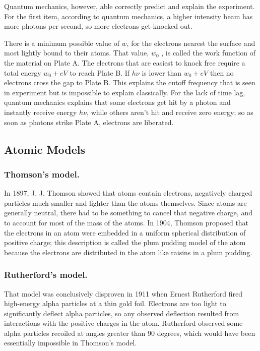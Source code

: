 \documentclass[../../main.tex]{subfiles}
\begin{document}
Quantum mechanics, however, able correctly predict and explain the experiment. For the first item, according to quantum mechanics, a higher intensity beam has more photons per second, so more electrons get knocked out. 

There is a minimum possible value of $w$, for the electrons nearest the surface and most lightly bound to their atoms. That value, $w_0$ , is called the work function of the material on Plate A. The electrons that are easiest to knock free require a total energy $w_0 + eV $ to reach Plate B. If $h\nu$ is lower than $w_0 + eV$ then no electrons cross the gap to Plate B. This explains the cutoff frequency that is seen in experiment but is impossible to explain classically. For the lack of time lag, quantum mechanics explains that some electrons get hit by a photon and instantly receive energy $h\nu$, while others aren't hit and receive zero energy; so as soon as photons strike Plate A, electrons are liberated.

\subsection{Atomic Models}
\subsubsection{Thomson's model.} In 1897, J. J. Thomson showed that atoms contain electrons, negatively charged particles much smaller and lighter than the atoms themselves. Since atoms are generally neutral, there had to be something to cancel that negative charge, and to account for most of the mass of the atoms. In 1904, Thomson proposed that the electrons in an atom were embedded in a uniform spherical distribution of positive charge; this description is called the plum pudding model of the atom because the electrons are distributed in the atom like raisins in a plum pudding.

\subsubsection{Rutherford's model.} That model was conclusively disproven in 1911 when Ernest Rutherford fired high-energy alpha particles at a thin gold foil. Electrons are too light to significantly deflect alpha particles, so any observed deflection resulted from interactions with the positive charges in the atom. Rutherford observed some alpha particles recoiled at angles greater than 90 degrees, which would have been essentially impossible in Thomson's model. 
\end{document}
